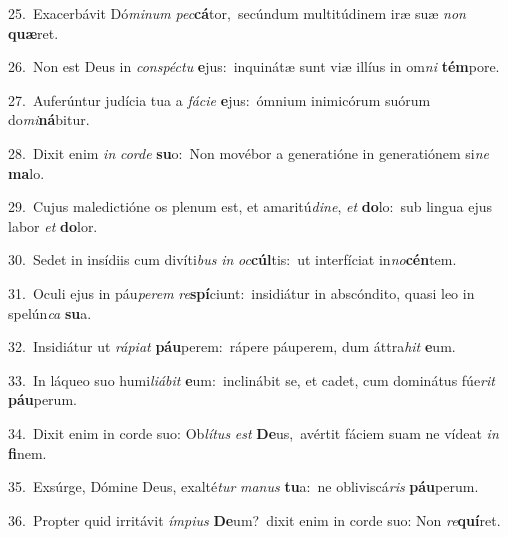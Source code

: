 {\numbfont\textcolor{\numbcolor}{25.}}~Exacerbávit Dó\-\textit{mi}\-\textit{num} \textit{pec}\-\textbf{cá}tor,~\star secúndum multitúdinem iræ suæ \textit{non} \textbf{quæ}\-ret.\par
{\numbfont\textcolor{\numbcolor}{26.}}~Non est Deus in \textit{con}\-\textit{spéc}\textit{tu} \textbf{e}\-jus:~\star inquinátæ sunt viæ illíus in om\textit{ni} \textbf{tém}\-pore.\par
{\numbfont\textcolor{\numbcolor}{27.}}~Auferúntur judícia tua a \textit{fá}\-\textit{ci}\textit{e} \textbf{e}\-jus:~\star ómnium inimicórum suórum do\-\textit{mi}\-\textbf{ná}bitur.\par
{\numbfont\textcolor{\numbcolor}{28.}}~Dixit enim \textit{in} \textit{cor}\-\textit{de} \textbf{su}\-o:~\star Non movébor a generatióne in generatiónem si\textit{ne} \textbf{ma}\-lo.\par
{\numbfont\textcolor{\numbcolor}{29.}}~Cujus maledictióne os plenum est, et amaritú\-\textit{di}\-\textit{ne}, \textit{et} \textbf{do}\-lo:~\star sub lingua ejus labor \textit{et} \textbf{do}\-lor.\par
{\numbfont\textcolor{\numbcolor}{30.}}~Sedet in insídiis cum divíti\textit{bus} \textit{in} \textit{oc}\-\textbf{cúl}tis:~\star ut interfíciat in\-\textit{no}\-\textbf{cén}tem.\par
{\numbfont\textcolor{\numbcolor}{31.}}~Oculi ejus in páu\-\textit{pe}\-\textit{rem} \textit{re}\-\textbf{spí}ciunt:~\star insidiátur in abscóndito, quasi leo in spelún\textit{ca} \textbf{su}\-a.\par
{\numbfont\textcolor{\numbcolor}{32.}}~Insidiátur ut \textit{rá}\-\textit{pi}\textit{at} \textbf{páu}\-perem:~\star rápere páuperem, dum áttra\textit{hit} \textbf{e}\-um.\par
{\numbfont\textcolor{\numbcolor}{33.}}~In láqueo suo humi\-\textit{li}\-\textit{á}\textit{bit} \textbf{e}\-um:~\star inclinábit se, et cadet, cum dominátus fúe\textit{rit} \textbf{páu}\-perum.\par
{\numbfont\textcolor{\numbcolor}{34.}}~Dixit enim in corde suo: Ob\-\textit{lí}\-\textit{tus} \textit{est} \textbf{De}\-us,~\star avértit fáciem suam ne vídeat \textit{in} \textbf{fi}\-nem.\par
{\numbfont\textcolor{\numbcolor}{35.}}~Exsúrge, Dómine Deus, exalté\textit{tur} \textit{ma}\-\textit{nus} \textbf{tu}\-a:~\star ne obliviscá\textit{ris} \textbf{páu}\-perum.\par
{\numbfont\textcolor{\numbcolor}{36.}}~Propter quid irritávit \textit{ím}\-\textit{pi}\textit{us} \textbf{De}\-um?~\star dixit enim in corde suo: Non \textit{re}\-\textbf{quí}ret.\par
